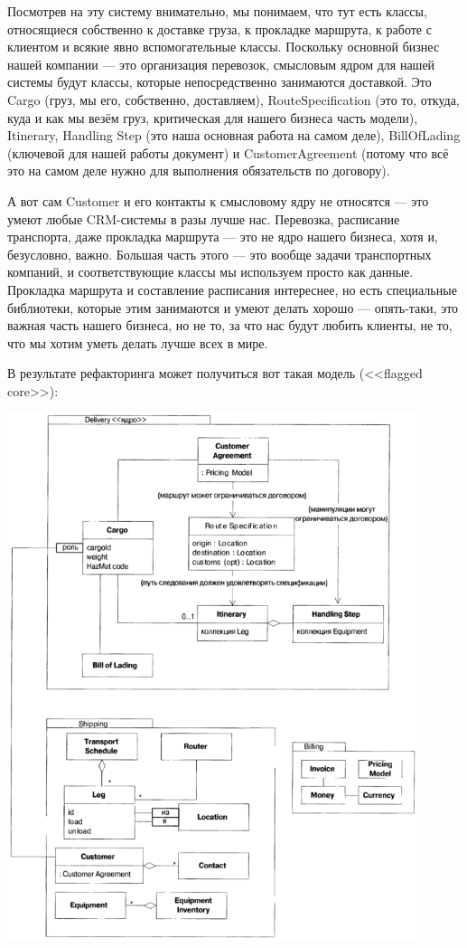 \documentclass[a5paper]{article}
\begin{document}
Посмотрев на эту систему внимательно, мы понимаем, что тут есть классы, относящиеся собственно к доставке груза, к прокладке маршрута, к работе с клиентом и всякие явно вспомогательные классы. Поскольку основной бизнес нашей компании --- это организация перевозок, смысловым ядром для нашей системы будут классы, которые непосредственно занимаются доставкой. Это Cargo (груз, мы его, собственно, доставляем), RouteSpecification (это то, откуда, куда и как мы везём груз, критическая для нашего бизнеса часть модели), Itinerary, Handling Step (это наша основная работа на самом деле), BillOfLading (ключевой для нашей работы документ) и CustomerAgreement (потому что всё это на самом деле нужно для выполнения обязательств по договору).

А вот сам Customer и его контакты к смысловому ядру не относятся --- это умеют любые CRM-системы в разы лучше нас. Перевозка, расписание транспорта, даже прокладка маршрута --- это не ядро нашего бизнеса, хотя и, безусловно, важно. Большая часть этого --- это вообще задачи транспортных компаний, и соответствующие классы мы используем просто как данные. Прокладка маршрута и составление расписания интереснее, но есть специальные библиотеки, которые этим занимаются и умеют делать хорошо --- опять-таки, это важная часть нашего бизнеса, но не то, за что нас будут любить клиенты, не то, что мы хотим уметь делать лучше всех в мире.

В результате рефакторинга может получиться вот такая модель (<<flagged core>>):

\begin{center}
    \includegraphics[width=0.9\textwidth]{shippingDistilled.png}
\end{center}
\end{document}
